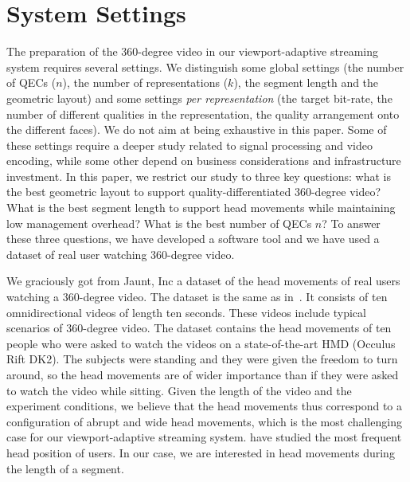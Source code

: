 \section{System Settings}
\label{sec:settings}

The preparation of the 360-degree video in our viewport-adaptive streaming system
requires several settings. We distinguish some global settings (the number of \acp{QEC} ($n$), 
the number of representations ($k$), the segment length and the geometric layout) 
and some settings \emph{per representation}
(the target bit-rate, the number of different qualities in the representation, the quality 
arrangement onto the different
faces). We do not aim
at being exhaustive in this paper. Some of these settings require a deeper study related to
signal processing and video encoding, while some other depend on business considerations and infrastructure investment. In this paper, we restrict our study
to three key questions: what is the best geometric layout to support quality-differentiated 360-degree
video? What is the best segment length to support head movements while maintaining low 
management overhead? What is the best number of \acp{QEC} $n$? To answer these three questions,
we have developed a software tool and we have used a dataset of real user watching 360-degree
video. 


We graciously got from Jaunt, Inc a dataset of the head movements
of real users watching a 360-degree video. The dataset is the same as
in~\cite{yu_framework_2015}. It consists of
ten omnidirectional videos of length ten seconds. These videos include
typical scenarios of 360-degree video. The dataset contains
the head movements of ten people who were asked to watch the videos on
a state-of-the-art \ac{HMD} (Occulus Rift DK2). The subjects were
standing and they were given the freedom to turn around, so the head
movements are of wider importance than if they were asked to watch the
video while sitting. Given the length of the video and the experiment
conditions, we believe that the head movements thus correspond to a
configuration of abrupt and wide head movements, which is the most
challenging case for our viewport-adaptive streaming system.
\citet{yu_framework_2015} have studied the most frequent head position of users.
In our case, we are interested in head movements during the
length of a segment.


